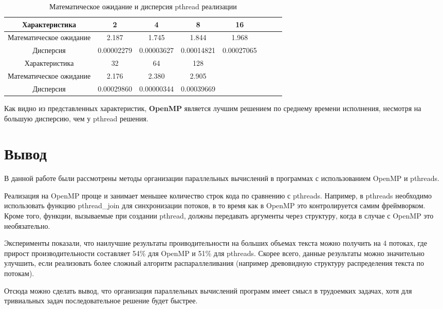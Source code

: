 \begin{table}[H]
	\centering
	\begin{tabular}{|c|c|c|c|c|c|c|c|}
		\hline
		Характеристика          & 2          & 4          & 8          & 16         \\ \hline
		Математическое ожидание & 2.187      & 1.745      & 1.844      & 1.968      \\ \hline
		Дисперсия               & 0.00002279 & 0.00003627 & 0.00014821 & 0.00027065 \\ \hline \hline
		Характеристика          & 32         & 64         & 128        &            \\ \hline
		Математическое ожидание & 2.176      & 2.380      & 2.905      &            \\ \hline
		Дисперсия               & 0.00029860 & 0.00000344 & 0.00039669 &            \\
		\hline
	\end{tabular}
	\caption{Математическое ожидание и дисперсия pthread реализации}
	\label{tab:stats}
\end{table}

Как видно из представленных характеристик, \textbf{OpenMP} является лучшим решением по среднему времени исполнения, несмотря на большую дисперсию, чем у pthread решения.

\clearpage
{}
\section*{Вывод}
В данной работе были рассмотрены методы организации параллельных вычислений в программах с использованием OpenMP и pthreads.

Реализация на OpenMP проще и занимает меньшее количество строк кода по сравнению с pthreads. Например, в pthreads необходимо использовать функцию pthread\_join для синхронизации потоков, в то время как в OpenMP это контролируется самим фреймворком. Кроме того, функции, вызываемые при создании pthread, должны передавать аргументы через структуру, когда в случае с OpenMP это необязательно.

Эксперименты показали, что наилучшие результаты проиводительности на больших объемах текста можно получить на 4 потоках, где прирост производительности составляет 54\% для OpenMP и 51\% для pthreads. Скорее всего, данные результаты можно значительно улучшить, если реализовать более сложный алгоритм распараллеливания (например древовидную структуру распределения текста по потокам).

Отсюда можно сделать вывод, что организация параллельных вычислений программ имеет смысл в трудоемких задачах, хотя для тривиальных задач последовательное решение будет быстрее.
